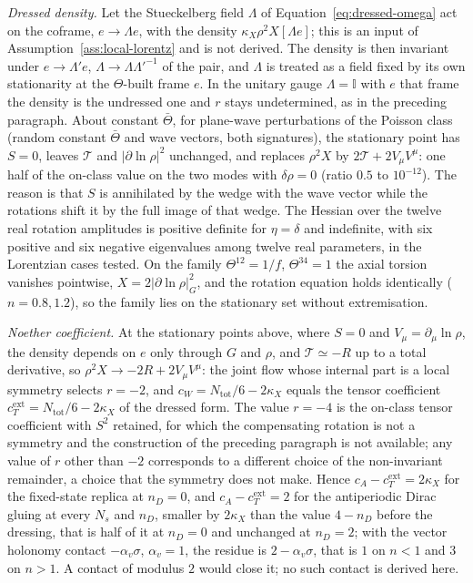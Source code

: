\emph{Dressed density.} Let the Stueckelberg field \(\Lambda\) of Equation~\eqref{eq:dressed-omega} act on the coframe, \(e\to\Lambda e\), with the density \(\kappa_X\rho^2X[\Lambda e]\); this is an input of Assumption~\ref{ass:local-lorentz} and is not derived. The density is then invariant under \(e\to\Lambda'e\), \(\Lambda\to\Lambda\Lambda'^{-1}\) of the pair, and \(\Lambda\) is treated as a field fixed by its own stationarity at the \(\Theta\)-built frame \(e\). In the unitary gauge \(\Lambda=\mathbb I\) with \(e\) that frame the density is the undressed one and \(r\) stays undetermined, as in the preceding paragraph. About constant \(\bar\Theta\), for plane-wave perturbations of the Poisson class (random constant \(\bar\Theta\) and wave vectors, both signatures), the stationary point has \(S=0\), leaves \(\mathcal T\) and \(\lvert\partial\ln\rho\rvert^2\) unchanged, and replaces \(\rho^2X\) by \(2\mathcal T+2V_\mu V^\mu\): one half of the on-class value on the two modes with \(\delta\rho=0\) (ratio \(0.5\) to \(10^{-12}\)). The reason is that \(S\) is annihilated by the wedge with the wave vector while the rotations shift it by the full image of that wedge. The Hessian over the twelve real rotation amplitudes is positive definite for \(\eta=\delta\) and indefinite, with six positive and six negative eigenvalues among twelve real parameters, in the Lorentzian cases tested. On the family \(\Theta^{12}=1/f\), \(\Theta^{34}=1\) the axial torsion vanishes pointwise, \(X=2\lvert\partial\ln\rho\rvert^2_G\), and the rotation equation holds identically (\(n=0.8,1.2\)), so the family lies on the stationary set without extremisation.

\emph{Noether coefficient.} At the stationary points above, where \(S=0\) and \(V_\mu=\partial_\mu\ln\rho\), the density depends on \(e\) only through \(G\) and \(\rho\), and \(\mathcal T\simeq-R\) up to a total derivative, so \(\rho^2X\to-2R+2V_\mu V^\mu\): the joint flow whose internal part is a local symmetry selects \(r=-2\), and \(c_W=N_{\mathrm{tot}}/6-2\kappa_X\) equals the tensor coefficient \(c_T^{\mathrm{ext}}=N_{\mathrm{tot}}/6-2\kappa_X\) of the dressed form. The value \(r=-4\) is the on-class tensor coefficient with \(S^2\) retained, for which the compensating rotation is not a symmetry and the construction of the preceding paragraph is not available; any value of \(r\) other than \(-2\) corresponds to a different choice of the non-invariant remainder, a choice that the symmetry does not make. Hence \(c_A-c_T^{\mathrm{ext}}=2\kappa_X\) for the fixed-state replica at \(n_D=0\), and \(c_A-c_T^{\mathrm{ext}}=2\) for the antiperiodic Dirac gluing at every \(N_s\) and \(n_D\), smaller by \(2\kappa_X\) than the value \(4-n_D\) before the dressing, that is half of it at \(n_D=0\) and unchanged at \(n_D=2\); with the vector holonomy contact \(-\alpha_v\sigma\), \(\alpha_v=1\), the residue is \(2-\alpha_v\sigma\), that is \(1\) on \(n<1\) and \(3\) on \(n>1\). A contact of modulus \(2\) would close it; no such contact is derived here.

